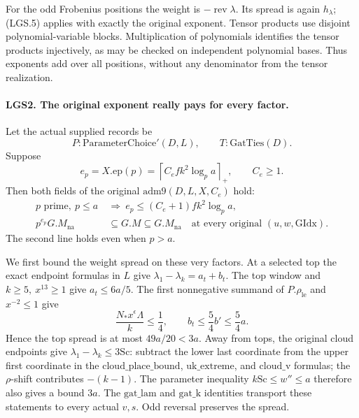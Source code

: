 For the odd Frobenius positions the weight is
\(-\operatorname{rev}\lambda\).  Its spread is again
\(h_\lambda\); (LGS.5) applies with exactly the original exponent.
Tensor products use disjoint polynomial-variable blocks.
Multiplication of polynomials identifies the tensor products
injectively, as may be checked on independent polynomial bases.
Thus exponents add over all positions, without any denominator
from the tensor realization.

\paragraph{LGS2. The original exponent really pays for every factor.}
\label{claim:LGS2}
Let the actual supplied records be
\[
       P:\mathrm{ParameterChoice}'(D,L),\qquad
       T:\mathrm{GatTies}(D).
\]
Suppose
\[
 e_p=X.\mathrm{ep}(p)
       =\left\lceil C_e f k^2\log_p a\right\rceil_+,
       \qquad C_e\ge1.                                  \tag{LGS.6}
\]
Then both fields of the original \(\mathrm{adm9}(D,L,X,C_e)\)
hold:
\[
 \begin{split}
 p\text{ prime},\ p\le a
   &\ \Longrightarrow\
       e_p\le(C_e+1)fk^2\log_p a,\\
 p^{e_p}G.M_{\mathrm{na}}
   &\ \subseteq G.M\subseteq G.M_{\mathrm{na}}
       \quad\text{at every original }(u,w,\mathrm{GIdx}).
 \end{split}                                                     \tag{LGS.7}
\]
The second line holds even when \(p>a\).

We first bound the weight spread on these very factors.
At a selected top the exact endpoint formulas in \(L\) give
\(\lambda_1-\lambda_k=a_t+b_t\).  The top window and
\(k\ge5,\ x^{13}\ge1\) give \(a_t\le6a/5\).
The first nonnegative summand of \(P.\rho_{\mathrm{le}}\)
and \(x^{-2}\le1\) give
\[
 \frac{N_*x^\epsilon\Lambda}{k}\le\frac14,\qquad
 b_t\le\frac54 b'\le\frac54a.
 \]
Hence the top spread is at most \(49a/20<3a\).
Away from tops, the original cloud endpoints give
\(\lambda_1-\lambda_k\le3\mathrm{Sc}\): subtract the lower
last coordinate from the upper first coordinate in the
\(\mathrm{cloud\_place\_bound}\),
\(\mathrm{uk\_extreme}\), and \(\mathrm{cloud\_v}\) formulas;
the \(\rho\)-shift contributes \(-(k-1)\).
The parameter inequality \(k\mathrm{Sc}\le w''\le a\)
therefore also gives a bound \(3a\).
The \(\mathrm{gat\_lam}\) and \(\mathrm{gat\_k}\) identities
transport these statements to every actual \(v,s\).
Odd reversal preserves the spread.

